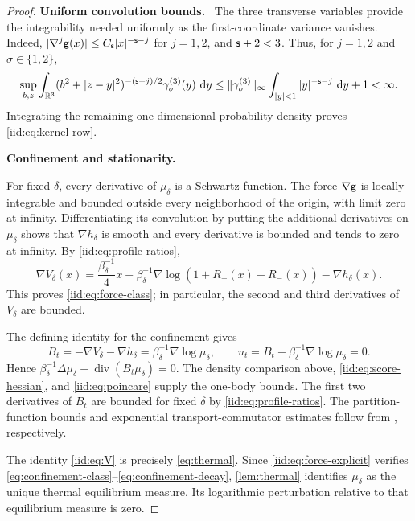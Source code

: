 \documentclass[11pt,reqno]{amsart}
\numberwithin{equation}{section}
\theoremstyle{plain}
\theoremstyle{remark}
\DeclarePairedDelimiter{\norm}{\lVert}{\rVert}
\DeclareMathOperator{\diver}{div}
\newcommand{\parheading}[1]{\par\medskip\noindent\textbf{#1}\ }
\begin{document}
\begin{proof}
\parheading{Uniform convolution bounds.}
The three transverse variables provide the integrability needed uniformly as the first-coordinate variance vanishes. Indeed, $|\nabla^j\mathsf g(x)|\le C_{\mathsf{s}}|x|^{-\mathsf{s}-j}$ for $j=1,2$, and $\mathsf{s}+2<3$. Thus, for $j=1,2$ and $\sigma\in\{1,2\}$,
\begin{equation}\label{iid:eq:transverse-integrability}
 \sup_{b,z}\int_{\R^3}(b^2+|z-y|^2)^{-(\s+j)/2}
 \gamma_\sigma^{(3)}(y)\,\dd y
 \le \norm{\gamma_\sigma^{(3)}}_\infty
 \int_{|y|<1}|y|^{-\s-j}\,\dd y+1<\infty.
\end{equation}
Integrating the remaining one-dimensional probability density proves \eqref{iid:eq:kernel-row}.
\parheading{Confinement and stationarity.}

For fixed $\delta$, every derivative of $\mu_\delta$ is a Schwartz function. The force $\nabla\mathsf g$ is locally integrable and bounded outside every neighborhood of the origin, with limit zero at infinity. Differentiating its convolution by putting the additional derivatives on $\mu_\delta$ shows that $\nabla h_\delta$ is smooth and every derivative is bounded and tends to zero at infinity. By \eqref{iid:eq:profile-ratios},
\begin{equation}\label{iid:eq:force-explicit}
 \nabla V_\delta(x)=\frac{\beta_\delta^{-1}}{4}x
 -\beta_\delta^{-1}\nabla\log(1+R_+(x)+R_-(x))-\nabla h_\delta(x).
\end{equation}
This proves \eqref{iid:eq:force-class}; in particular, the second and third derivatives of $V_\delta$ are bounded.

The defining identity for the confinement gives
\begin{equation}\label{iid:eq:stationary-drift}
 B_t=-\nabla V_\delta-\nabla h_\delta
 =\beta_\delta^{-1}\nabla\log\mu_\delta,
 \qquad
 u_t=B_t-\beta_\delta^{-1}\nabla\log\mu_\delta=0.
\end{equation}
Hence $\beta_\delta^{-1}\Delta\mu_\delta-\diver(B_t\mu_\delta)=0$. The density comparison above, \eqref{iid:eq:score-hessian}, and \eqref{iid:eq:poincare} supply the one-body bounds. The first two derivatives of $B_t$ are bounded for fixed $\delta$ by \eqref{iid:eq:profile-ratios}. The partition-function bounds and exponential transport-commutator estimates follow from \cite[Theorems~2.2 and~2.8]{DGRpartition}, respectively.

The identity \eqref{iid:eq:V} is precisely \eqref{eq:thermal}. Since \eqref{iid:eq:force-explicit} verifies \eqref{eq:confinement-class}--\eqref{eq:confinement-decay}, \cref{lem:thermal} identifies $\mu_\delta$ as the unique thermal equilibrium measure. Its logarithmic perturbation relative to that equilibrium measure is zero.
\end{proof}
\end{document}
